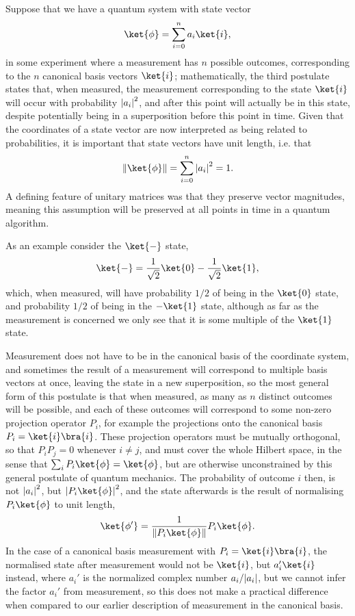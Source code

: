 Suppose that we have a quantum system with state vector
\[\ket{\phi} = \sum_{i=0}^n a_i\ket{i},\]
in some experiment where a measurement has $n$ possible outcomes, corresponding to the $n$ canonical basis vectors $\ket{i}$; mathematically, the third postulate states that, when measured, the measurement corresponding to the state $\ket{i}$ will occur with probability $\left| a_i \right|^2$, and after this point will actually be in this state, despite potentially being in a superposition before this point in time. Given that the coordinates of a state vector are now interpreted as being related to probabilities, it is important that state vectors have unit length, i.e. that
\[\norm{\ket{\phi}} = \sum_{i=0}^n \ord{a_i}^2 = 1.\]
A defining feature of unitary matrices was that they preserve vector magnitudes, meaning this assumption will be preserved at all points in time in a quantum algorithm.

As an example consider the $\ket{-}$ state,
\[\ket{-}=\frac{1}{\sqrt{2}}\ket{0} - \frac{1}{\sqrt{2}}\ket{1},\]
which, when measured, will have probability $1/2$ of being in the $\ket{0}$ state, and probability $1/2$ of being in the $-\ket{1}$ state, although as far as the measurement is concerned we only see that it is some multiple of the $\ket{1}$ state.

Measurement does not have to be in the canonical basis of the coordinate system, and sometimes the result of a measurement will correspond to multiple basis vectors at once, leaving the state in a new superposition, so the most general form of this postulate is that when measured, as many as $n$ distinct outcomes will be possible, and each of these outcomes will correspond to some non-zero projection operator $P_i$, for example the projections onto the canonical basis $P_i = \ket{i}\bra{i}$. These projection operators must be mutually orthogonal, so that $P_iP_j = 0$ whenever $i \neq j$, and must cover the whole Hilbert space, in the sense that $\sum_i P_i\ket{\phi} = \ket{\phi}$, but are otherwise unconstrained by this general postulate of quantum mechanics. The probability of outcome $i$ then, is not $\left| a_i \right|^2$, but $\ord{P_i\ket{\phi}}^2$, and the state afterwards is the result of normalising $P_i \ket{\phi}$ to unit length,
\[\ket{\phi'} = \frac{1}{\norm{P_i \ket{\phi}}}P_i\ket{\phi}.\]
In the case of a canonical basis measurement with $P_i = \ket{i}\bra{i}$, the normalised state after measurement would not be $\ket{i}$, but $a_i'\ket{i}$ instead, where $a_i'$ is the normalized complex number ${a_i}/{\left| a_i \right|}$, but we cannot infer the factor $a_i'$ from measurement, so this does not make a practical difference when compared to our earlier description of measurement in the canonical basis.

